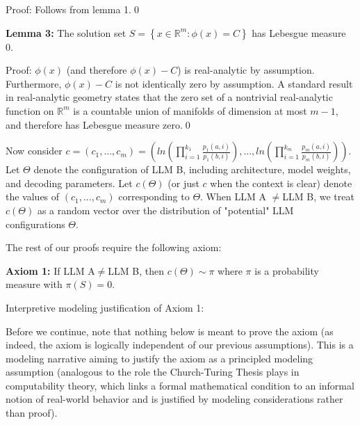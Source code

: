 \documentclass{article}
\begin{document}
Proof: Follows from lemma 1.\qed 



\textbf{Lemma 3:} The solution set $\displaystyle S=\left\{x\in \mathbb{R}^{m} :\phi \left( x\right) =C\right\}$ has Lebesgue measure 0.

Proof: $\displaystyle \phi \left( x\right)$ (and therefore $\displaystyle \phi \left( x\right) -C$) is real-analytic by assumption. Furthermore, $\displaystyle \phi \left( x\right) -C$ is not identically zero by assumption. A standard result in real-analytic geometry states that the zero set of a nontrivial real-analytic function on $\displaystyle \mathbb{R}^{m}$ is a countable union of manifolds of dimension at most $\displaystyle m-1$, and therefore has Lebesgue measure zero.\qed 



Now consider $\displaystyle c=\left( c_{1} ,...,c_{m}\right) =\left( ln\left(\prod _{i=1}^{k_{1}}\frac{p_{1}\left( a,i\right)}{p_{1}\left( b,i\right)}\right) ,...,ln\left(\prod _{i=1}^{k_{m}}\frac{p_{m}\left( a,i\right)}{p_{m}\left( b,i\right)}\right)\right)$. Let $\displaystyle \Theta $ denote the configuration of LLM B, including architecture, model weights, and decoding parameters. Let $\displaystyle c\left( \Theta \right)$ (or just $\displaystyle c$ when the context is clear) denote the values of $\displaystyle \left( c_{1} ,...,c_{m}\right)$ corresponding to $\displaystyle \Theta $. When LLM A $\displaystyle \neq $LLM B, we treat $\displaystyle c\left( \Theta \right)$ as a random vector over the distribution of "potential" LLM configurations $\displaystyle \Theta $.



The rest of our proofs require the following axiom:



\textbf{Axiom 1:} If LLM A$\displaystyle \neq $LLM B, then $\displaystyle c\left( \Theta \right) \sim \pi $ where $\displaystyle \pi $ is a probability measure with $\displaystyle \pi \left( S\right) =0$.



Interpretive modeling justification of Axiom 1:

Before we continue, note that nothing below is meant to prove the axiom (as indeed, the axiom is logically independent of our previous assumptions). This is a modeling narrative aiming to justify the axiom as a principled modeling assumption (analogous to the role the Church-Turing Thesis plays in computability theory, which links a formal mathematical condition to an informal notion of real-world behavior and is justified by modeling considerations rather than proof).
\end{document}
